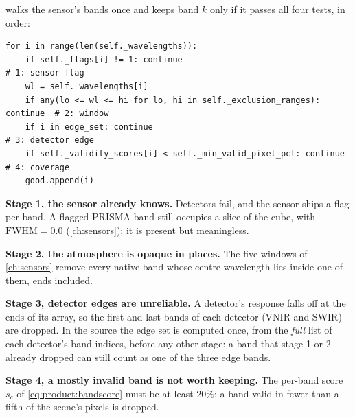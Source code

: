  walks the sensor's bands once and keeps band $k$
only if it passes all four tests, in order:
\begin{lstlisting}
for i in range(len(self._wavelengths)):
    if self._flags[i] != 1: continue                                   # 1: sensor flag
    wl = self._wavelengths[i]
    if any(lo <= wl <= hi for lo, hi in self._exclusion_ranges): continue  # 2: window
    if i in edge_set: continue                                         # 3: detector edge
    if self._validity_scores[i] < self._min_valid_pixel_pct: continue  # 4: coverage
    good.append(i)
\end{lstlisting}

\textbf{Stage 1, the sensor already knows.} Detectors fail, and the sensor ships a flag per band.
A flagged PRISMA band still occupies a slice of the cube, with $\mathrm{FWHM} = 0.0$
(\cref{ch:sensors}); it is present but meaningless.

\textbf{Stage 2, the atmosphere is opaque in places.} The five windows of \cref{ch:sensors} remove
every native band whose centre wavelength lies inside one of them, ends included.

\textbf{Stage 3, detector edges are unreliable.} A detector's response falls off at the ends of its
array, so the first and last  bands of each detector (VNIR and SWIR) are
dropped. In the source the edge set is computed once, from the \emph{full} list of each detector's
band indices, before any other stage: a band that stage 1 or 2 already dropped can still count as
one of the three edge bands.

\textbf{Stage 4, a mostly invalid band is not worth keeping.} The per-band score $s_c$ of
\cref{eq:product:bandscore} must be at least $20\%$: a band valid in fewer than a fifth of the
scene's pixels is dropped.

